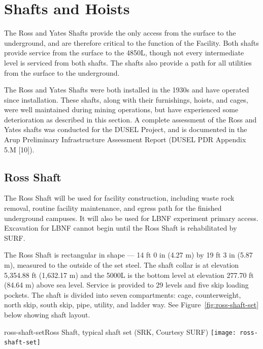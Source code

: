 \section{Shafts and Hoists}
\label{sec:fscf-und-shafts}

The Ross and Yates Shafts provide the only access from the surface to the underground, and are therefore critical to the function of the Facility. Both shafts provide service from the surface to the 4850L, though not every intermediate level is serviced from both shafts. The shafts also provide a path for all utilities from the surface to the underground. 

The Ross and Yates Shafts were both installed in the 1930s and have operated since installation. These shafts, along with their furnishings, hoists, and cages, were well maintained during mining operations, but have experienced some deterioration as described in this section. A complete assessment of the Ross and Yates shafts was conducted for the DUSEL Project, and is documented in the Arup Preliminary Infrastructure Assessment Report (DUSEL PDR Appendix 5.M [10]).



\subsection{Ross Shaft}
\label{sec:fscf-und-shafts-ross}

The Ross Shaft will be used for facility construction, including waste rock removal, routine facility maintenance, and egress path for the finished underground campuses. It will also be used for LBNF experiment primary access. Excavation for LBNF cannot begin until the Ross Shaft is rehabilitated by  SURF.

The Ross Shaft is rectangular in shape --- 14 ft 0 in (4.27 m) by 19 ft 3 in (5.87 m), measured to the outside of the set steel. The shaft collar is at elevation 5,354.88 ft (1,632.17 m) and the 5000L is the bottom level at elevation 277.70 ft (84.64 m) above sea level. Service is provided to 29 levels and five skip loading pockets. The shaft is divided into seven compartments: cage, counterweight, north skip, south skip, pipe, utility, and ladder way. See Figure~\ref{fig:ross-shaft-set} below showing shaft layout.


\begin{cdrfigure}{ross-shaft-set}{Ross Shaft, typical shaft set (SRK, Courtesy SURF)}
\texttt{[image: ross-shaft-set]}
\end{cdrfigure}

